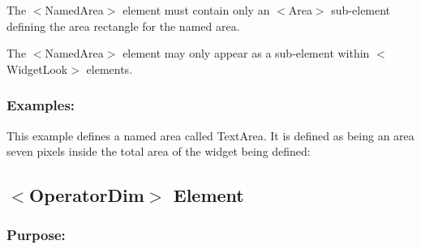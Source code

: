 \begin{DoxyItemize}
\item The {\ttfamily $<$Named\+Area$>$} element must contain only an {\ttfamily $<$Area$>$} sub-\/element defining the area rectangle for the named area. 
\item The {\ttfamily $<$Named\+Area$>$} element may only appear as a sub-\/element within {\ttfamily $<$Widget\+Look$>$} elements. 
\end{DoxyItemize}\hypertarget{fal_element_ref_fal_elem_ref_sec_24_4}{}\subsubsection{Examples\+:}\label{fal_element_ref_fal_elem_ref_sec_24_4}
This example defines a named area called \textquotesingle{}Text\+Area\textquotesingle{}. It is defined as being an area seven pixels inside the total area of the widget being defined\+: 
\begin{DoxyCode}{0}
\end{DoxyCode}
\hypertarget{fal_element_ref_fal_elem_ref_sec_operatordim}{}\subsection{$<$\+Operator\+Dim$>$ Element}\label{fal_element_ref_fal_elem_ref_sec_operatordim}
\hypertarget{fal_element_ref_fal_elem_ref_sec_operatordim_1}{}\subsubsection{Purpose\+:}\label{fal_element_ref_fal_elem_ref_sec_operatordim_1}
